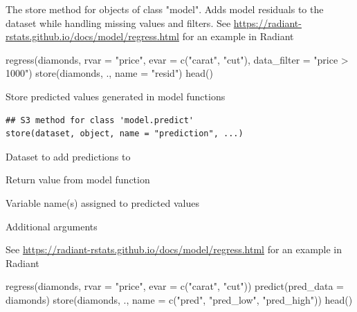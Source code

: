 \documentclass[a4paper]{book}
\begin{document}
%
\begin{Details}
The store method for objects of class "model". Adds model residuals to the dataset while handling missing values and filters. See \url{https://radiant-rstats.github.io/docs/model/regress.html} for an example in Radiant
\end{Details}
%
\begin{Examples}
\begin{ExampleCode}
regress(diamonds, rvar = "price", evar = c("carat", "cut"), data_filter = "price > 1000") %
  store(diamonds, ., name = "resid") %
  head()

\end{ExampleCode}
\end{Examples}
%
\begin{Description}
Store predicted values generated in model functions
\end{Description}
%
\begin{Usage}
\begin{verbatim}
## S3 method for class 'model.predict'
store(dataset, object, name = "prediction", ...)
\end{verbatim}
\end{Usage}
%
\begin{Arguments}
\begin{ldescription}
\item[\code{dataset}] Dataset to add predictions to

\item[\code{object}] Return value from model function

\item[\code{name}] Variable name(s) assigned to predicted values

\item[\code{...}] Additional arguments
\end{ldescription}
\end{Arguments}
%
\begin{Details}
See \url{https://radiant-rstats.github.io/docs/model/regress.html} for an example in Radiant
\end{Details}
%
\begin{Examples}
\begin{ExampleCode}
regress(diamonds, rvar = "price", evar = c("carat", "cut")) %
  predict(pred_data = diamonds) %
  store(diamonds, ., name = c("pred", "pred_low", "pred_high")) %
  head()

\end{ExampleCode}
\end{Examples}
\end{document}
